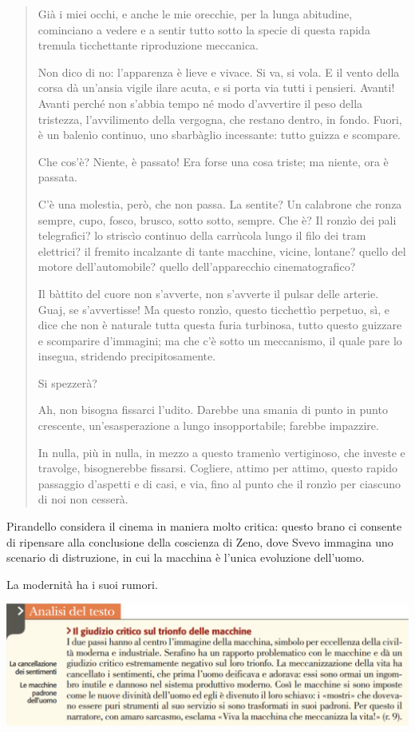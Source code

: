 \documentclass[a4paper, twoside, titlepage]{book}
\begin{document}
\begin{quotation}
Già i miei occhi, e anche le mie orecchie, per la lunga abitudine, cominciano a vedere e a sentir tutto sotto la specie di questa rapida tremula ticchettante riproduzione meccanica.

Non dico di no: l'apparenza è lieve e vivace. Si va, si vola. E il vento della corsa dà un'ansia vigile ilare acuta, e si porta via tutti i pensieri. Avanti! Avanti perché non s'abbia tempo né modo d'avvertire il peso della tristezza, l'avvilimento della vergogna, che restano dentro, in fondo. Fuori, è un balenìo continuo, uno sbarbàglio incessante: tutto guizza e scompare.

Che cos'è? Niente, è passato! Era forse una cosa triste; ma niente, ora è passata.

C'è una molestia, però, che non passa. La sentite? Un calabrone che ronza sempre, cupo, fosco, brusco, sotto sotto, sempre. Che è? Il ronzìo dei pali telegrafici? lo striscìo continuo della carrùcola lungo il filo dei tram elettrici? il fremito incalzante di tante macchine, vicine, lontane? quello del motore dell'automobile? quello dell'apparecchio cinematografico?

Il bàttito del cuore non s'avverte, non s'avverte il pulsar delle arterie. Guaj, se s'avvertisse! Ma questo ronzìo, questo ticchettìo perpetuo, sì, e dice che non è naturale tutta questa furia turbinosa, tutto questo guizzare e scomparire d'immagini; ma che c'è sotto un meccanismo, il quale pare lo insegua, stridendo precipitosamente.

Si spezzerà?

Ah, non bisogna fissarci l'udito. Darebbe una smania di punto in punto crescente, un'esasperazione a lungo insopportabile; farebbe impazzire.

In nulla, più in nulla, in mezzo a questo tramenìo vertiginoso, che investe e travolge, bisognerebbe fissarsi. Cogliere, attimo per attimo, questo rapido passaggio d'aspetti e di casi, e via, fino al punto che il ronzìo per ciascuno di noi non cesserà.
\end{quotation}

Pirandello considera il cinema in maniera molto critica: questo brano ci consente di ripensare alla conclusione della coscienza di Zeno, dove Svevo immagina uno scenario di distruzione, in cui la macchina è l’unica evoluzione dell’uomo.

La modernità ha i suoi rumori.

\begin{center}
\includegraphics[width=\textwidth]{macchina1}
\end{center}
\end{document}
